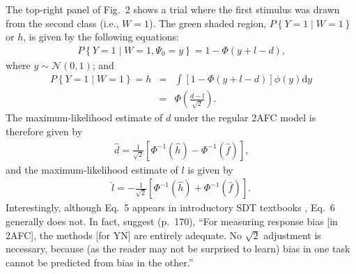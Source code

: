 \documentclass[man]{apa6}
\begin{document}
The top-right panel of Fig.~2 shows a trial where the first stimulus was drawn from the second class (i.e., $W=1$). The green shaded region, $P\left\{Y=1\mid{}W=1\right\}$ or $h$, is given by the following equations:
\begin{eqnarray*}
P\left\{Y=1\mid{}W=1,\Psi_0=y\right\}=1-\Phi\left(y+l-d\right)\textrm{,}
\end{eqnarray*} where $y\sim\mathcal{N}\left(0,1\right)$; and
\begin{eqnarray*}
P\left\{Y=1\mid{}W=1\right\}=h&=&\int\!\left[1-\Phi\left(y+l-d\right)\right]\phi\left(y\right)\textrm{d}y\\
&=&\Phi\left(\frac{d-l}{\sqrt{2}}\right)\textrm{.}
\end{eqnarray*}
The maximum-likelihood estimate of $d$ under the regular 2AFC model is therefore given by
\begin{eqnarray}
\hat{d}=\frac{1}{\sqrt{2}}\left[\Phi^{-1}\left(\hat{h}\right)-\Phi^{-1}\left(\hat{f}\right)\right]\textrm{,}
\label{eq5}
\end{eqnarray} and the maximum-likelihood estimate of $l$ is given by\begin{eqnarray}
\hat{l}=-\frac{1}{\sqrt{2}}\left[\Phi^{-1}\left(\hat{h}\right)+\Phi^{-1}\left(\hat{f}\right)\right]\textrm{.}
\label{eq6}
\end{eqnarray}Interestingly, although Eq.~5 appears in introductory SDT textbooks \parencite[e.g.,][]{Green1966, Macmillan2005}, Eq.~6 generally does not. In fact, \citeauthor{Macmillan2005} suggest (p.~170), ``For measuring response bias [in 2AFC], the methods [for YN] are entirely adequate. No $\sqrt{2}$ adjustment is necessary, because (as the reader may not be surprised to learn) bias in one task cannot be predicted from bias in the other.''
\end{document}
